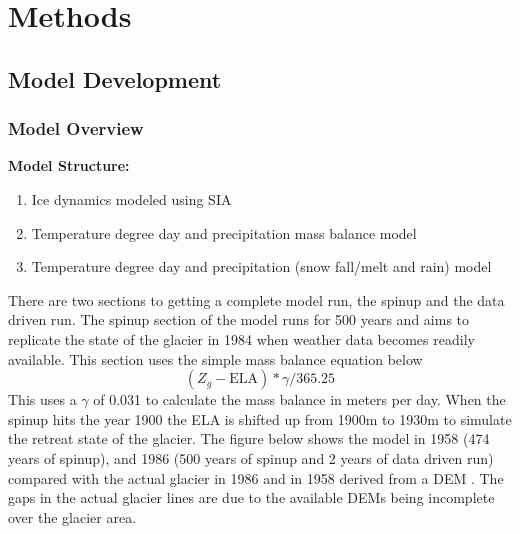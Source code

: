 \documentclass{article}
\begin{document}
\section{Methods}

\subsection{Model Development}
\subsubsection{Model Overview}

\textbf{Model Structure:}
\begin{enumerate}[leftmargin=2cm]
    \item Ice dynamics modeled using SIA
    \item Temperature degree day and precipitation mass balance model
    \item Temperature degree day and precipitation (snow fall/melt and rain) model
\end{enumerate}

There are two sections to getting a complete model run, the spinup and the data driven run. The spinup section of the model runs for 500 years and aims to replicate the 
state of the glacier in 1984 when weather data becomes readily available. This section uses the simple mass balance equation below
\begin{equation}(Z_g-\text{ELA})*\gamma /365.25\end{equation}
This uses a $\gamma$ of 0.031 to calculate the mass balance in meters per day. When the spinup hits the year 1900 the ELA is shifted up from 1900m to 1930m to simulate the 
retreat state of the glacier. The figure below shows the model in 1958 (474 years of spinup), and 1986 (500 years of spinup and 2 years of data driven run) compared with the actual 
glacier in 1986 and in 1958 derived from a DEM \cite{ref3}. The gaps in the actual glacier lines are due to the available DEMs being incomplete over the glacier area.
\end{document}
